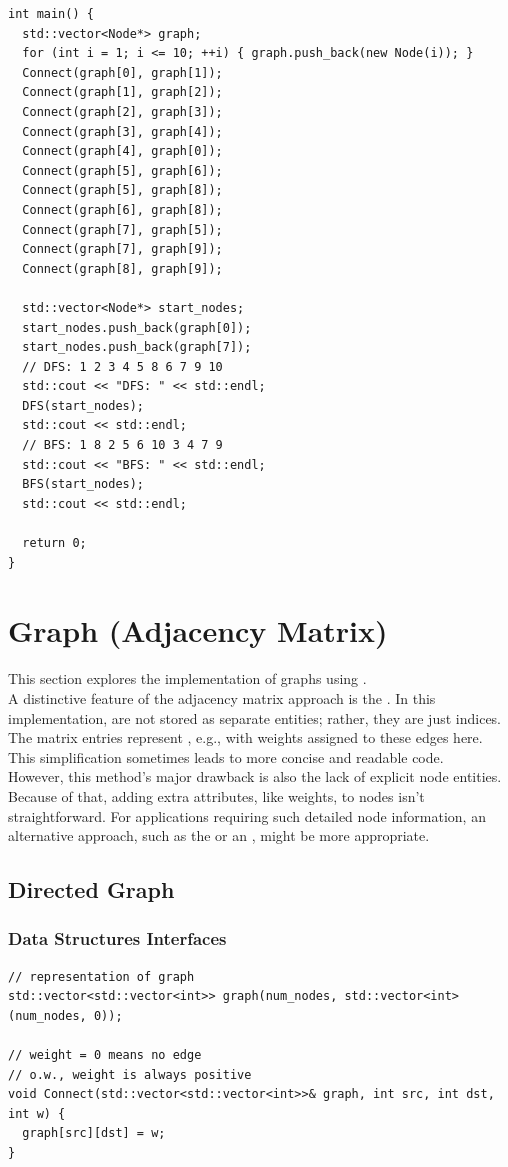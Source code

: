 \begin{lstlisting}
int main() {
  std::vector<Node*> graph;
  for (int i = 1; i <= 10; ++i) { graph.push_back(new Node(i)); }
  Connect(graph[0], graph[1]);
  Connect(graph[1], graph[2]);
  Connect(graph[2], graph[3]);
  Connect(graph[3], graph[4]);
  Connect(graph[4], graph[0]);
  Connect(graph[5], graph[6]);
  Connect(graph[5], graph[8]);
  Connect(graph[6], graph[8]);
  Connect(graph[7], graph[5]);
  Connect(graph[7], graph[9]);
  Connect(graph[8], graph[9]);

  std::vector<Node*> start_nodes;
  start_nodes.push_back(graph[0]);
  start_nodes.push_back(graph[7]);
  // DFS: 1 2 3 4 5 8 6 7 9 10
  std::cout << "DFS: " << std::endl;
  DFS(start_nodes);
  std::cout << std::endl;
  // BFS: 1 8 2 5 6 10 3 4 7 9
  std::cout << "BFS: " << std::endl;
  BFS(start_nodes);
  std::cout << std::endl;

  return 0;
}
\end{lstlisting}

\section{Graph (Adjacency Matrix)}
This section explores the implementation of graphs using {\color{blue}{adjacency matrix}}.\\

A distinctive feature of the adjacency matrix approach is the {\color{blue}{implicit node representation}}. In this implementation, {\color{blue}{nodes}} are not stored as separate entities; rather, they are just indices. The matrix entries represent {\color{blue}{edges}}, e.g., with weights assigned to these edges here.  This simplification sometimes leads to more concise and readable code. \\

However, this method's major drawback is also the lack of explicit node entities. Because of that, adding extra attributes, like weights, to nodes isn't straightforward. For applications requiring such detailed node information, an alternative approach, such as the {\color{blue}{universal implementation}} or an {\color{blue}{adjacency list}}, might be more appropriate.

\subsection{Directed Graph}
\subsubsection{Data Structures Interfaces}
\begin{lstlisting}
// representation of graph
std::vector<std::vector<int>> graph(num_nodes, std::vector<int>(num_nodes, 0));

// weight = 0 means no edge
// o.w., weight is always positive
void Connect(std::vector<std::vector<int>>& graph, int src, int dst, int w) {
  graph[src][dst] = w;
}
\end{lstlisting}
